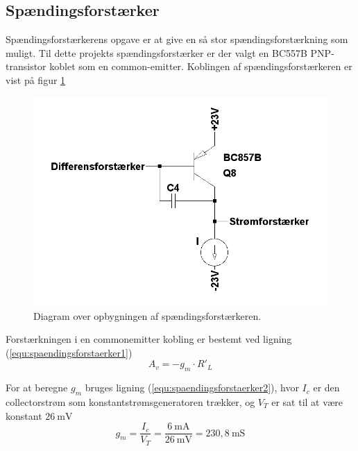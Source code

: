 \subsection{Spændingsforstærker}
\label{effekt_spaendingsforstaerker}
Spændingsforstærkerens opgave er at give en så stor spændingsforstærkning som muligt. Til dette projekts spændingsforstærker er der valgt en BC557B PNP-transistor koblet som en common-emitter. Koblingen af spændingsforstærkeren er vist på figur \ref{spaendingsforstaerker_diagram}

\begin{figure}[h]
\centering
\includegraphics[scale=0.3]{teknisk/effektforstaerker/spaendingsforstaerker_diagram.png}
\caption{Diagram over opbygningen af spændingsforstærkeren.}
\label{spaendingsforstaerker_diagram}
\end{figure}

Forstærkningen i en commonemitter kobling er bestemt ved ligning (\ref{equ:spaendingsforstaerker1}) \cite{ael-mm7}%
\begin{equation}
\label{equ:spaendingsforstaerker1}
A_v = -g_m \cdot R'_L
\end{equation}

For at beregne $g_m$ bruges ligning (\ref{equ:spaendingsforstaerker2}), hvor $I_c$ er den collectorstrøm som konstantstrømsgeneratoren trækker, og $V_T$ er sat til at være konstant $26~\mathrm{mV}$
\begin{equation}
\label{equ:spaendingsforstaerker2}
g_m = \frac{I_c}{V_T} = \frac{6~\mathrm{mA}}{26~\mathrm{mV}} = 230,8~\mathrm{mS}
\end{equation}

